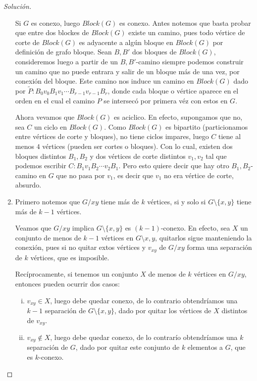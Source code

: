 \documentclass[12pt]{report}
\theoremstyle{plain}
\theoremstyle{definition}
\newenvironment{solution}{\begin{proof}[Solución]}{\end{proof}}
\begin{document}
\begin{solution}
\begin{enumerate}
Si $G$ es conexo, luego $Block(G)$ es conexo. Antes notemos que basta probar que entre dos blockes de $Block (G)$ existe un camino, pues todo vértice de corte de $Block (G)$ es adyacente a algún bloque en $Block (G)$ por definición de grafo bloque. Sean $B,B'$ dos bloques de $Block(G)$, consideremos luego a partir de un $B,B'$-camino siempre podemos construir un camino que no puede entrara y salir de un bloque más de una vez, por conexión del bloque. Este camino nos induce un camino en $Block(G)$ dado por $\tilde P : B_0 v_0 B_1 v_1 \cdots B_{r-1} v_{r-1} B_r $, donde cada bloque o vértice aparece en el orden en el cual el camino $P$ se intersecó por primera véz con estos en $G$.

Ahora vevamos que $Block(G)$ es aciclico. En efecto, supongamos que no, sea $C$ un ciclo en $Block(G)$. Como $Block(G)$ es bipartito (particionamos entre vértices de corte y bloques), no tiene ciclos impares, luego $C$ tiene al menos $4$ vértices (pueden ser cortes o bloques). Con lo cual, existen dos bloques distintos $B_1,B_2$ y dos vértices de corte distintos $v_1,v_2$ tal que podemos escribir $C : B_1 v_1 B_2 \cdots v_2 B_1$. Pero esto quiere decir que hay otro $B_1,B_2$-camino en $G$ que no pasa por $v_1$, es decir que $v_1$ no era vértice de corte, absurdo.

\item Primero notemos que $G/xy$ tiene más de $k$ vértices, si y solo si $G \setminus \{ x,y \}$ tiene más de $k-1$ vértices.

Veamos que $G/xy$ implica $G\setminus \{x,y\}$ es $(k-1)$-conexo. En efecto, sea $X$ un conjunto de menos de $k-1$ vértices en $G \setminus{x,y}$, quitarlos sigue manteniendo la conexión, pues si no quitar extos vértices y $v_{xy}$ de $G/xy$ forma una separación de $k$ vértices, que es imposible.

Recíprocamente, si tenemos un conjunto $X$ de menos de $k$ vértices en $G/xy$, entonces pueden ocurrir dos casos:
\begin{enumerate}[(i)]
\item $v_{xy} \in X$, luego debe quedar conexo, de lo contrario obtendríamos una $k-1$ separación de $G\setminus \{x,y\}$, dado por quitar los vértices de $X$ distintos de $v_{xy}$.
\item $v_{xy} \not \in X$, luego debe quedar conexo, de lo contrarío obtendríamos una $k$ separación de $G$, dado por quitar este conjunto de $k$ elementos a $G$, que es $k$-conexo.
\end{enumerate}
\end{enumerate}
\end{solution}
\end{document}
